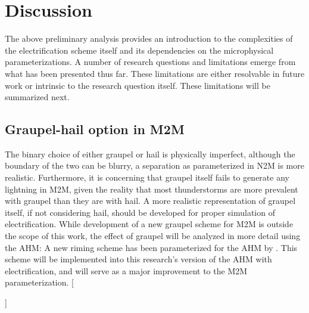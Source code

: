  
\chapter{Discussion}
\resetfootnote %
\label{chap:discus}
The above preliminary analysis provides an introduction to the complexities of the  electrification scheme itself and its dependencies on the microphysical parameterizations. A number of research questions and limitations emerge from what has been presented thus far. These limitations are either resolvable in future work or intrinsic to the research question itself. These limitations will be summarized next.
\section{Graupel-hail option in M2M}
The binary choice of either graupel or hail is physically imperfect, although the boundary of the two can be blurry, a separation as parameterized in N2M is more realistic. Furthermore, it is concerning that graupel itself fails to generate any lightning in M2M, given the reality that most thunderstorms are more prevalent with graupel than they are with hail. A more realistic representation of graupel itself, if not considering hail, should be developed for proper simulation of electrification. While development of a new graupel scheme for M2M is outside the scope of this work, the effect of graupel will be analyzed in more detail using the AHM: A new riming scheme has been parameterized for the AHM by \cite{jensen2015modeling}. This scheme will be implemented into this research's version of the AHM with electrification, and will serve as a major improvement to the M2M parameterization.
[

]

